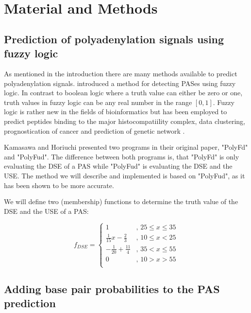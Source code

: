 \section{Material and Methods}


\subsection{Prediction of polyadenylation signals using fuzzy logic}
As mentioned in the introduction there are many methods available to predict polyadenylation signals. \citeauthor{pmid19393560} introduced a method for detecting PASes using fuzzy logic. In contrast to boolean logic where a truth value can either be zero or one, truth values in fuzzy logic can be any real number in the range $[0,1]$. Fuzzy logic is rather new in the fields of bioinformatics but has been employed to predict peptides binding to the major histocompatiility complex, data clustering, prognostication of cancer and prediction of genetic network . 

Kamasawa and Horiuchi presented two programs in their original paper, "PolyFd" and "PolyFud". The difference between both programs is, that "PolyFd" is only evaluating the DSE of a PAS while "PolyFud" is evaluating the DSE and the USE. The method we will describe and implemented is based on "PolyFud", as it has been shown to be more accurate.

We will define two (membership) functions to determine the truth value of the DSE and the USE of a PAS:

\begin{equation*}
f_{DSE}=
  \begin{cases}
	1 & \text{, $25 \leq x \leq 35$} \\
	\frac{1}{15}x - \frac{2}{3} & \text{, $10 \leq x < 25$} \\
	-\frac{1}{20} + \frac{11}{4} & \text{, $35< x \leq 55$} \\
	0 & \text{, $10 > x > 55$} \\
  \end{cases}
\end{equation*}



\subsection{Adding base pair probabilities to the PAS prediction}


